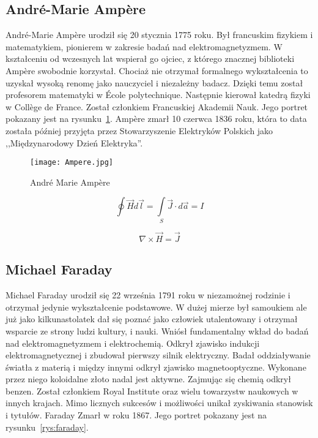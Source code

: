 \subsection{André-Marie Ampère}
André-Marie Ampère urodził się 20 stycznia 1775 roku. Był francuskim fizykiem i matematykiem, pionierem w zakresie badań nad elektromagnetyzmem. W kształceniu od wczesnych lat wspierał go ojciec, z którego znacznej biblioteki Ampère swobodnie korzystał. Chociaż nie otrzymał formalnego wykształcenia to uzyskał wysoką renomę jako nauczyciel i niezależny badacz. Dzięki temu został profesorem matematyki w École polytechnique. Następnie kierował katedrą fizyki w Collège de France. Został członkiem Francuskiej Akademii Nauk. Jego portret pokazany jest na rysunku~\ref{rys:ampere}. Ampère zmarł 10 czerwca 1836 roku, która to data została później przyjęta przez Stowarzyszenie Elektryków Polskich jako ,,Międzynarodowy Dzień Elektryka''.

\begin{figure}[!hb]
	\centering \texttt{[image: Ampere.jpg]}
	\caption{André Marie Ampère}
	\label{rys:ampere}
\end{figure}

\begin{equation}
    \oint \vec{H} d\vec{l} = \int\limits_{S} \vec{J} \cdot d \vec{a} = I
\end{equation}

\begin{equation}
    \nabla \times \vec{H} = \vec{J}
\end{equation}

\subsection{Michael Faraday}
Michael Faraday urodził się 22 września 1791 roku w niezamożnej rodzinie i otrzymał jedynie wykształcenie podstawowe. W dużej mierze był samoukiem ale już jako kilkunastolatek dał się poznać jako człowiek utalentowany i otrzymał wsparcie ze strony ludzi kultury, i nauki. Wniósł fundamentalny wkład do badań nad elektromagnetyzmem i elektrochemią. Odkrył zjawisko indukcji elektromagnetycznej i zbudował pierwszy silnik elektryczny. Badał oddziaływanie światła z materią i między innymi odkrył zjawisko magnetooptyczne. Wykonane przez niego koloidalne złoto nadal jest aktywne. Zajmując się chemią odkrył benzen. Został członkiem Royal Institute oraz wielu towarzystw naukowych w innych krajach. Mimo licznych sukcesów i możliwości unikał zyskiwania stanowisk i tytułów. Faraday Zmarł w roku 1867. Jego portret pokazany jest na rysunku~\ref{rys:faraday}.

